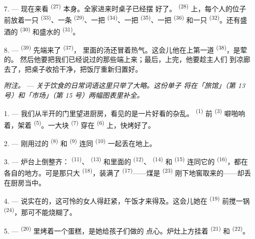7. --- 现在来看 \textsuperscript{(27)} 本身。全家进来时桌子已经摆
好了。 \textsuperscript{(28)} 上，每个人的位子前放着一只
\textsuperscript{(33)}、一条 \textsuperscript{(29)}、一把
\textsuperscript{(34)}、一把 \textsuperscript{(35)}、一把
\textsuperscript{(36)} 和一只 \textsuperscript{(32)}。还有盛酒的
 \textsuperscript{(30)} 和盛水的 \textsuperscript{(31)}。

8. ---  \textsuperscript{(39)} 先端来了 \textsuperscript{(37)}，
里面的汤还冒着热气。这会儿他在上第一道 \textsuperscript{(38)}，是荤的。
然后他要把我们已经说过的那些端上来；最后，上完，他要趁主人们
到凉廊去了，把桌子收拾干净，把饭厅重新归置好。

\textit{附注。} --- \textit{关于饮食的日常词语这里只举了大略。这份单子
将在「旅馆」（第 13 号）和「市场」（第 15 号）两幅图表里补全。}

\VUsaut{4.6mm}
\VUsaut{3.0mm}

1. --- 我们从半开的门里望进厨房，看见的是一片好看的杂乱。
\textsuperscript{(1)} 前 \textsuperscript{(3)} 噼啪响着，架着
\textsuperscript{(5)}。一大块 \textsuperscript{(7)} 穿在
\textsuperscript{(6)} 上，快烤好了。

2. --- 刚用过的 \textsuperscript{(8)} 和 \textsuperscript{(9)}
连同 \textsuperscript{(10)} 一起丢在地上。

3. --- 炉台上倒整齐： \textsuperscript{(11)}、
\textsuperscript{(13)} 和里面的 \textsuperscript{(12)}、
\textsuperscript{(14)} 和 \textsuperscript{(15)} 连同它的
 \textsuperscript{(16)}，都在各自的地方。可是那只大
\textsuperscript{(18)}，装满了 \textsuperscript{(17)}——煤是
\textsuperscript{(23)} 刚下地窖取来的——却丢在厨房当中。

4. --- 说实在的，这可怜的女人得赶紧，午饭才来得及。这会儿她在
\textsuperscript{(19)} 前搅一锅 \textsuperscript{(24)}，那可不能烧糊了。

5. ---  \textsuperscript{(20)} 里烤着一个蛋糕，是她给孩子们做的
点心。炉灶上方挂着 \textsuperscript{(21)} 和
\textsuperscript{(22)}。

